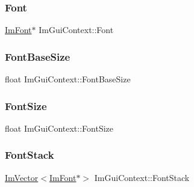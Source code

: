 \hypertarget{struct_im_gui_context_aec64e774018a7d74515baeb9e06fb4e3}{}\label{struct_im_gui_context_aec64e774018a7d74515baeb9e06fb4e3} 
\subsubsection{\texorpdfstring{Font}{Font}}
{\footnotesize\ttfamily \hyperlink{struct_im_font}{Im\+Font}$\ast$ Im\+Gui\+Context\+::\+Font}

\hypertarget{struct_im_gui_context_a0fcbda57d25b80111283ed7305ee3ee8}{}\label{struct_im_gui_context_a0fcbda57d25b80111283ed7305ee3ee8} 
\subsubsection{\texorpdfstring{Font\+Base\+Size}{FontBaseSize}}
{\footnotesize\ttfamily float Im\+Gui\+Context\+::\+Font\+Base\+Size}

\hypertarget{struct_im_gui_context_af4022d1866887cdc400131fc6a65b200}{}\label{struct_im_gui_context_af4022d1866887cdc400131fc6a65b200} 
\subsubsection{\texorpdfstring{Font\+Size}{FontSize}}
{\footnotesize\ttfamily float Im\+Gui\+Context\+::\+Font\+Size}

\hypertarget{struct_im_gui_context_a8a6a9f23604fe0d0b51c78e45e4432b0}{}\label{struct_im_gui_context_a8a6a9f23604fe0d0b51c78e45e4432b0} 
\subsubsection{\texorpdfstring{Font\+Stack}{FontStack}}
{\footnotesize\ttfamily \hyperlink{class_im_vector}{Im\+Vector}$<$\hyperlink{struct_im_font}{Im\+Font}$\ast$$>$ Im\+Gui\+Context\+::\+Font\+Stack}

\hypertarget{struct_im_gui_context_a39aec37f209c91a4e4f503bd2e365081}{}\label{struct_im_gui_context_a39aec37f209c91a4e4f503bd2e365081} 
